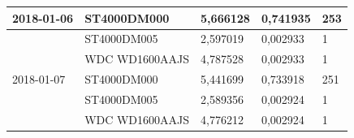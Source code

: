 \documentclass{VUMIFPSkursinis}
\begin{document}
\begin{table}[H]
{\begin{tabular}{|l|l|l|l|l|}
2018-01-06                          & ST4000DM000                           & 5,666128                               & 0,741935                             & 253                                  \\ \hline
\cellcolor[HTML]{C0C0C0}            & ST4000DM005                           & 2,597019                               & 0,002933                             & 1                                    \\ \hline
\cellcolor[HTML]{C0C0C0}            & WDC WD1600AAJS                        & 4,787528                               & 0,002933                             & 1                                    \\ \hline
2018-01-07                          & ST4000DM000                           & 5,441699                               & 0,733918                             & 251                                  \\ \hline
\cellcolor[HTML]{C0C0C0}            & ST4000DM005                           & 2,589356                               & 0,002924                             & 1                                    \\ \hline
\cellcolor[HTML]{C0C0C0}            & WDC WD1600AAJS                        & 4,776212                               & 0,002924                             & 1                                    \\ \hline
\end{tabular}}
\end{table}
\end{document}
